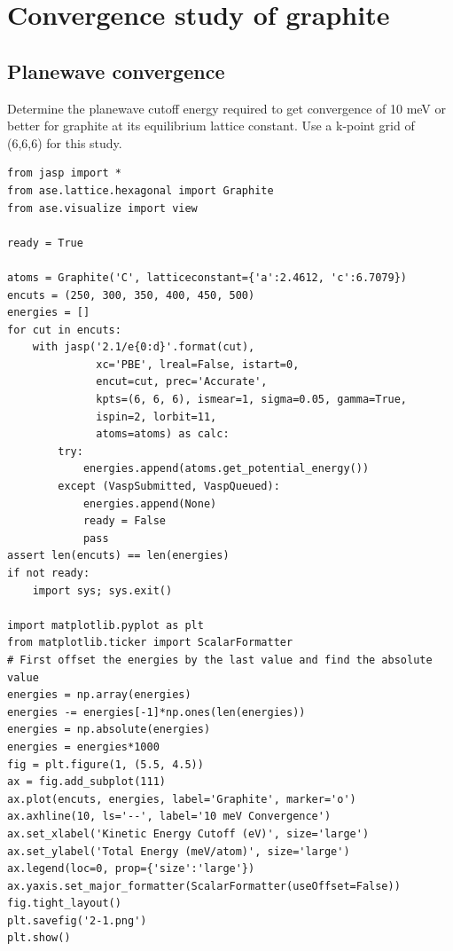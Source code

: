 \documentclass[11pt]{article}
\begin{document}
\section{Convergence study of graphite}
\label{sec-2}
\subsection{Planewave convergence}
\label{sec-2-1}

Determine the planewave cutoff energy required to get convergence of 10 meV or better for graphite at its equilibrium lattice constant. Use a k-point grid of (6,6,6) for this study.


\begin{verbatim}
from jasp import *
from ase.lattice.hexagonal import Graphite
from ase.visualize import view

ready = True

atoms = Graphite('C', latticeconstant={'a':2.4612, 'c':6.7079})
encuts = (250, 300, 350, 400, 450, 500)
energies = []
for cut in encuts:
    with jasp('2.1/e{0:d}'.format(cut),
              xc='PBE', lreal=False, istart=0,
              encut=cut, prec='Accurate',
              kpts=(6, 6, 6), ismear=1, sigma=0.05, gamma=True,
              ispin=2, lorbit=11,
              atoms=atoms) as calc:
        try:
            energies.append(atoms.get_potential_energy())
        except (VaspSubmitted, VaspQueued):
            energies.append(None)
            ready = False
            pass
assert len(encuts) == len(energies)
if not ready:
    import sys; sys.exit()

import matplotlib.pyplot as plt
from matplotlib.ticker import ScalarFormatter
# First offset the energies by the last value and find the absolute value
energies = np.array(energies)
energies -= energies[-1]*np.ones(len(energies))
energies = np.absolute(energies)
energies = energies*1000
fig = plt.figure(1, (5.5, 4.5))
ax = fig.add_subplot(111)
ax.plot(encuts, energies, label='Graphite', marker='o')
ax.axhline(10, ls='--', label='10 meV Convergence')
ax.set_xlabel('Kinetic Energy Cutoff (eV)', size='large')
ax.set_ylabel('Total Energy (meV/atom)', size='large')
ax.legend(loc=0, prop={'size':'large'})
ax.yaxis.set_major_formatter(ScalarFormatter(useOffset=False))
fig.tight_layout()
plt.savefig('2-1.png')
plt.show()
\end{verbatim}
\end{document}

